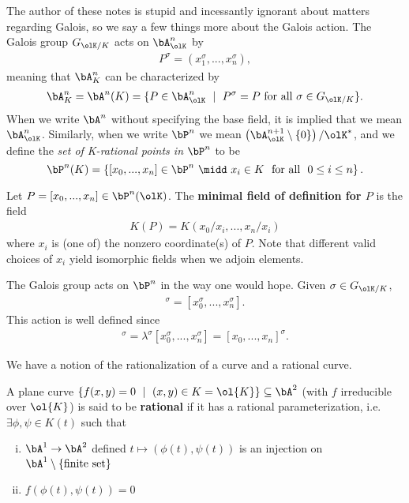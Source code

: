 The author of these notes is stupid and incessantly ignorant about matters regarding Galois, so we say a few things more about the Galois action. The Galois group  $G_{\olK/K}$ acts on $\bA^n_{\olK}$ by
\begin{align*}
	P^\sigma = (x_1^\sigma,...,x_n^\sigma),
\end{align*}
meaning that $\bA^n_K$ can be characterized by
\begin{align*}
	\bA^n_K = \bA^n(K) = \{P \in \bA^n_{\olK} ~\mid~ P^\sigma = P \text{ for all } \sigma \in G_{\olK/K}\}.
\end{align*}
When we write  $\bA^n$ without specifying the base field, it is implied that we mean $\bA^n_{\olK}$. Similarly, when we write $\bP^n$ we mean  $\left(\bA^{n+1}_{\olK}\setminus\{0\}\right)/\olK^*$, and we define the \emph{set of K-rational points in } $\bP^n$ to be 
\begin{equation}\label{eqn:K-rational-P-points}
	\bP^n(K) = \left\{[x_0,...,x_n] \in \bP^n ~\midd~ x_i \in K ~\text{ for all } ~0\leq i\leq n\right\}.
\end{equation}
\begin{defn}\label{defn:minimal-field-of-definition-for-P}
	Let $P = [x_0,...,x_n]\in \bP^n(\olK)$. The \textbf{minimal field of definition for $P$} is the field
	\begin{align*}
		K(P) = K(x_0/x_i,...,x_n/x_i)
	\end{align*}
	where $x_i$ is (one of) the nonzero coordinate(s) of $P$. Note that different valid choices of $x_i$ yield isomorphic fields when we adjoin elements.
\end{defn}
The Galois group acts on $\bP^n$ in the way one would hope. Given $\sigma \in G_{\olK/K}$,
\begin{align*}
	[x_0,...,x_n]^{\sigma} = [x_0^\sigma,...,x_n^\sigma].
\end{align*}
This action is well defined since
\begin{align*}
	[\lambda x_0, ...,\lambda x_n]^\sigma = \lambda^\sigma[x_0^\sigma,...,x_n^\sigma] = [x_0,...,x_n]^\sigma.
\end{align*}

We have a notion of the rationalization of a curve and a rational curve.
\begin{defn}\label{defn:plane-curve-rational}
	A plane curve $\{f(x,y) = 0 ~\mid~ (x,y) \in K = \ol{K}\} \subseteq \bA^2$ (with $f$ irreducible over $\ol{K}$) is said to be \textbf{rational} if it has a rational parameterization, i.e. $\exists \phi, \psi \in K(t)$ such that

	\begin{enumerate}[(i)]
		\item $\bA^1\to \bA^2$ defined $t \mapsto (\phi(t), \psi(t))$ is an injection on $\bA^1\setminus \{\text{finite set}\}$
		\item $f(\phi(t),\psi(t)) = 0$
	\end{enumerate}
\end{defn}

